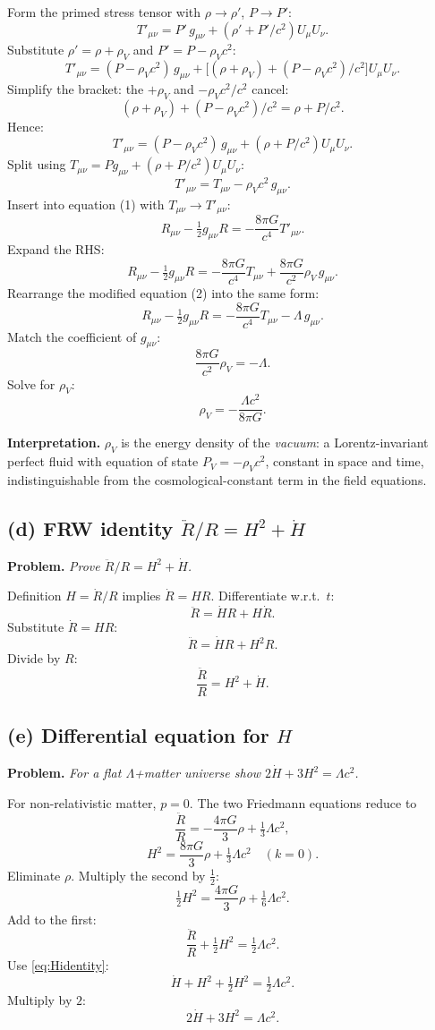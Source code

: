 \documentclass[11pt]{article}
\begin{document}
Form the primed stress tensor with $\rho\to\rho'$, $P\to P'$:
\[
T'_{\mu\nu} = P'\,g_{\mu\nu}+(\rho'+P'/c^2)U_\mu U_\nu.
\]
Substitute $\rho' = \rho + \rho_V$ and $P' = P - \rho_V c^2$:
\[
T'_{\mu\nu} = (P-\rho_V c^2)\,g_{\mu\nu} + \bigl[(\rho + \rho_V) + (P-\rho_V c^2)/c^2\bigr]U_\mu U_\nu.
\]
Simplify the bracket: the $+\rho_V$ and $-\rho_V c^2/c^2$ cancel:
\[
(\rho + \rho_V) + (P-\rho_V c^2)/c^2 = \rho + P/c^2.
\]
Hence:
\[
T'_{\mu\nu} = (P-\rho_V c^2)\,g_{\mu\nu} + (\rho + P/c^2)U_\mu U_\nu.
\]
Split using $T_{\mu\nu} = P g_{\mu\nu} + (\rho+P/c^2)U_\mu U_\nu$:
\[
T'_{\mu\nu} = T_{\mu\nu} - \rho_V c^2\,g_{\mu\nu}.
\]
Insert into equation (1) with $T_{\mu\nu}\to T'_{\mu\nu}$:
\[
R_{\mu\nu}-\tfrac{1}{2}g_{\mu\nu}R = -\frac{8\pi G}{c^4}T'_{\mu\nu}.
\]
Expand the RHS:
\[
R_{\mu\nu}-\tfrac{1}{2}g_{\mu\nu}R = -\frac{8\pi G}{c^4}T_{\mu\nu} + \frac{8\pi G}{c^2}\rho_V\,g_{\mu\nu}.
\]
Rearrange the modified equation (2) into the same form:
\[
R_{\mu\nu}-\tfrac{1}{2}g_{\mu\nu}R = -\frac{8\pi G}{c^4}T_{\mu\nu} - \Lambda\,g_{\mu\nu}.
\]
Match the coefficient of $g_{\mu\nu}$:
\[
\frac{8\pi G}{c^2}\rho_V = -\Lambda.
\]
Solve for $\rho_V$:
\[
\boxed{\;\rho_V = -\frac{\Lambda c^2}{8\pi G}.\;}
\]

\textbf{Interpretation.} $\rho_V$ is the energy density of the \emph{vacuum}: a Lorentz-invariant perfect fluid with equation of state $P_V = -\rho_V c^2$, constant in space and time, indistinguishable from the cosmological-constant term in the field equations.

\subsection*{(d) FRW identity $\ddot R/R = H^2 + \dot H$}

\textbf{Problem.} \emph{Prove $\ddot R/R = H^2 + \dot H$.}

Definition $H = \dot R/R$ implies $\dot R = H R$. Differentiate w.r.t.\ $t$:
\[
\ddot R = \dot H R + H\dot R.
\]
Substitute $\dot R = H R$:
\[
\ddot R = \dot H R + H^2 R.
\]
Divide by $R$:
\[
\boxed{\;\frac{\ddot R}{R} = H^2 + \dot H.\;}
\]
\label{eq:Hidentity}

\subsection*{(e) Differential equation for $H$}

\textbf{Problem.} \emph{For a flat $\Lambda$+matter universe show $2\dot H + 3H^2 = \Lambda c^2$.}

For non-relativistic matter, $p = 0$. The two Friedmann equations reduce to
\[
\frac{\ddot R}{R} = -\frac{4\pi G}{3}\rho + \tfrac{1}{3}\Lambda c^2,
\]
\[
H^2 = \frac{8\pi G}{3}\rho + \tfrac{1}{3}\Lambda c^2 \quad (k=0).
\]
Eliminate $\rho$. Multiply the second by $\tfrac{1}{2}$:
\[
\tfrac{1}{2}H^2 = \frac{4\pi G}{3}\rho + \tfrac{1}{6}\Lambda c^2.
\]
Add to the first:
\[
\frac{\ddot R}{R} + \tfrac{1}{2}H^2 = \tfrac{1}{2}\Lambda c^2.
\]
Use \eqref{eq:Hidentity}:
\[
\dot H + H^2 + \tfrac{1}{2}H^2 = \tfrac{1}{2}\Lambda c^2.
\]
Multiply by $2$:
\[
\boxed{\;2\dot H + 3H^2 = \Lambda c^2.\;}
\]
\label{eq:Hode}
\end{document}
